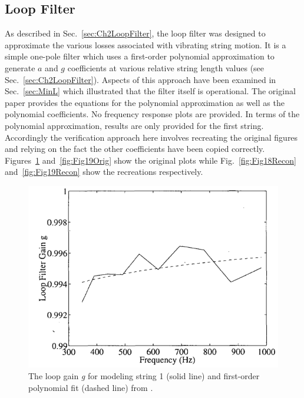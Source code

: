 \documentclass[../main.tex]{subfiles}
\begin{document}
\clearpage

\subsection{Loop Filter}
\label{subsec:Ch4LoopFilter}
As described in Sec.~\ref{sec:Ch2LoopFilter}, the loop filter was designed to approximate the various losses associated with vibrating string motion. It is a simple one-pole filter which uses a first-order polynomial approximation to generate $a$ and $g$ coefficients at various relative string length values (see Sec.~\ref{sec:Ch2LoopFilter}). Aspects of this approach have been examined in Sec.~\ref{sec:MinL} which illustrated that the filter itself is operational. The original paper provides the equations for the polynomial approximation as well as the polynomial coefficients. No frequency response plots are provided. In terms of the polynomial approximation, results are only provided for the first string. Accordingly the verification approach here involves recreating the original figures and relying on the fact the other coefficients have been copied correctly. Figures~\ref{fig:Fig18Orig} and~\ref{fig:Fig19Orig} show the original plots while Fig.~\ref{fig:Fig18Recon} and~\ref{fig:Fig19Recon} show the recreations respectively.

\begin{figure}[h!]
    \centering
    \includegraphics[scale=.50]{./images/plots/Figure18Orig.png}
    \caption{The loop gain \emph{g} for modeling string 1 (solid line) and first-order polynomial fit (dashed line) from .}
    \label{fig:Fig18Orig}
\end{figure}
\end{document}
